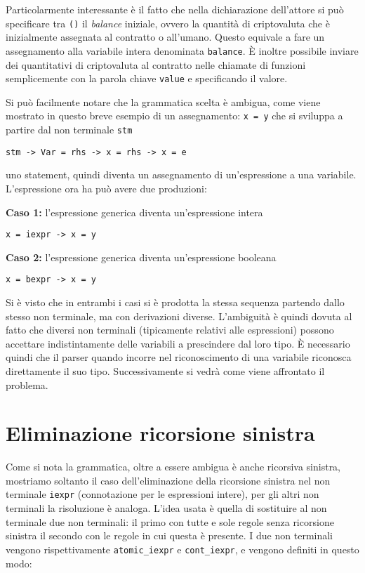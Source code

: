 \documentclass[12pt,a4paper]{report}
\begin{document}
Particolarmente interessante è il fatto che nella dichiarazione
dell'attore si può specificare tra \texttt{()} il \emph{balance}
iniziale, ovvero la quantità di criptovaluta che è inizialmente
assegnata al contratto o all'umano. Questo equivale a fare un
assegnamento alla variabile intera denominata \texttt{balance}. È
inoltre possibile inviare dei quantitativi di criptovaluta al contratto
nelle chiamate di funzioni semplicemente con la parola chiave
\texttt{value} e specificando il valore.

Si può facilmente notare che la grammatica scelta è ambigua, come viene
mostrato in questo breve esempio di un assegnamento: \texttt{x\ =\ y}
che si sviluppa a partire dal non terminale \texttt{stm}

\begin{verbatim}
stm -> Var = rhs -> x = rhs -> x = e
\end{verbatim}

uno statement, quindi diventa un assegnamento di un'espressione a una
variabile. L'espressione ora ha può avere due produzioni:

\textbf{Caso 1:} l'espressione generica diventa un'espressione intera

\begin{verbatim}
x = iexpr -> x = y
\end{verbatim}

\textbf{Caso 2:} l'espressione generica diventa un'espressione booleana

\begin{verbatim}
x = bexpr -> x = y
\end{verbatim}

Si è visto che in entrambi i casi si è prodotta la stessa sequenza
partendo dallo stesso non terminale, ma con derivazioni diverse.
L'ambiguità è quindi dovuta al fatto che diversi non terminali
(tipicamente relativi alle espressioni) possono accettare
indistintamente delle variabili a prescindere dal loro tipo. È
necessario quindi che il parser quando incorre nel riconoscimento di una
variabile riconosca direttamente il suo tipo. Successivamente si vedrà
come viene affrontato il problema.

\hypertarget{eliminazione-ricorsione-sinistra}{%
\section{Eliminazione ricorsione
sinistra}\label{eliminazione-ricorsione-sinistra}}

Come si nota la grammatica, oltre a essere ambigua è anche ricorsiva
sinistra, mostriamo soltanto il caso dell'eliminazione della ricorsione
sinistra nel non terminale \texttt{iexpr} (connotazione per le
espressioni intere), per gli altri non terminali la risoluzione è
analoga. L'idea usata è quella di sostituire al non terminale due non
terminali: il primo con tutte e sole regole senza ricorsione sinistra il
secondo con le regole in cui questa è presente. I due non terminali
vengono rispettivamente \texttt{atomic\_iexpr} e \texttt{cont\_iexpr}, e
vengono definiti in questo modo:
\end{document}
